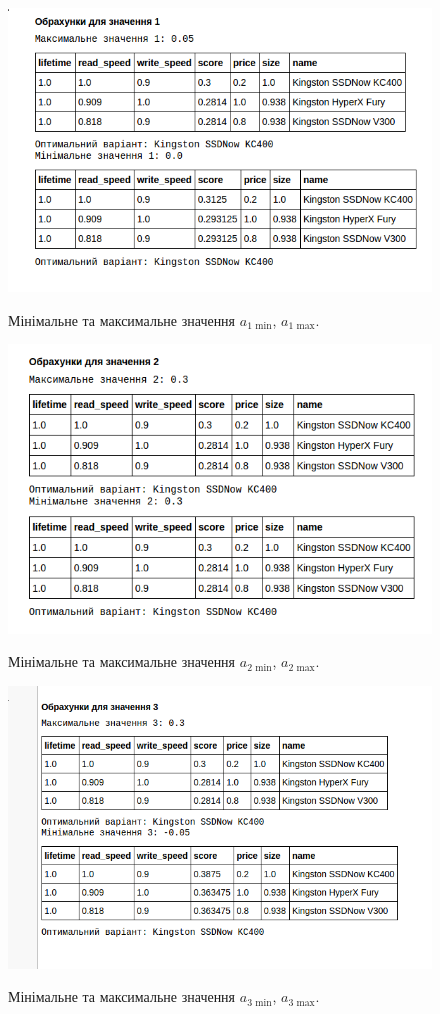 \begin{figure}[H]
  \centering
  \includegraphics[width=.9\linewidth]{images/lab2/min_max_1.png}
  \label{f:min_max_a_1} 
  \caption{Мінімальне та максимальне значення $a_{1 \text{ min}}$, $a_{1 \text{ max}}$.}
\end{figure}
\begin{figure}[H]
  \centering
  \includegraphics[width=.9\linewidth]{images/lab2/min_max_2.png}
  \label{f:min_max_a_2} 
  \caption{Мінімальне та максимальне значення $a_{2 \text{ min}}$, $a_{2 \text{ max}}$.}
\end{figure}
\begin{figure}[H]
  \centering
  \includegraphics[width=.9\linewidth]{images/lab2/min_max_3.png}
  \label{f:min_max_a_3} 
  \caption{Мінімальне та максимальне значення $a_{3 \text{ min}}$, $a_{3 \text{ max}}$.}
\end{figure}
